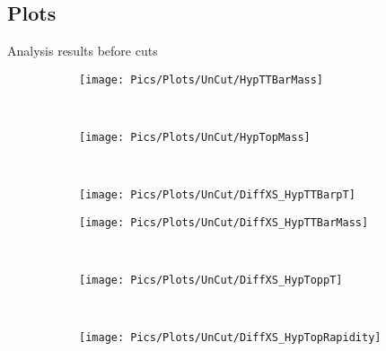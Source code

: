 \documentclass{beamer}
\begin{document}
\subsection{Plots}
\begin{frame}[t]{Analysis results before cuts}
	\begin{figure}[H]
		\centering
		\begin{subfigure}[b]{0.30\textwidth}
			\centering
			\texttt{[image: Pics/Plots/UnCut/HypTTBarMass]}
		\end{subfigure}~
		\begin{subfigure}[b]{0.30\textwidth}
			\centering
			\texttt{[image: Pics/Plots/UnCut/HypTopMass]}
		\end{subfigure}~
		\begin{subfigure}[b]{0.30\textwidth}
			\centering
			\texttt{[image: Pics/Plots/UnCut/DiffXS\_HypTTBarpT]}
		\end{subfigure}
		\begin{subfigure}[b]{0.30\textwidth}
			\centering
			\texttt{[image: Pics/Plots/UnCut/DiffXS\_HypTTBarMass]}
		\end{subfigure}~
		\begin{subfigure}[b]{0.30\textwidth}
			\centering
			\texttt{[image: Pics/Plots/UnCut/DiffXS\_HypToppT]}
		\end{subfigure}~
		\begin{subfigure}[b]{0.30\textwidth}
			\centering
			\texttt{[image: Pics/Plots/UnCut/DiffXS\_HypTopRapidity]}
		\end{subfigure}
	\end{figure}
\end{frame}
\end{document}
